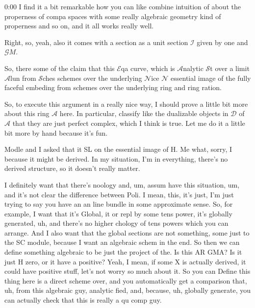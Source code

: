 \begin{unfinished}{0:00}
I find it a bit remarkable how you can like combine intuition of about the properness of compa spaces with some really algebraic geometry kind of properness and so on, and it all works really well.

Right, so, yeah, also it comes with a section as a unit section $\mathcal{I}$ given by one and $\mathcal{G}M$.

So, there some of the claim that this $\mathcal{E}$qa curve, which is $\mathcal{A}$nalytic $\mathcal{S}$t over a limit $\mathcal{A}$lun from $\mathcal{S}$ches schemes over the underlying $\mathcal{N}$ice $\mathcal{N}$ essential image of the fully faceful embeding from schemes over the underlying ring and ring ration.

So, to execute this argument in a really nice way, I should prove a little bit more about this ring $\mathcal{A}$ here. In particular, classify like the dualizable objects in $\mathcal{D}$ of $\mathcal{A}$ that they are just perfect complex, which I think is true. Let me do it a little bit more by hand because it's fun.

Modle and I asked that it SL on the essential image of H. Me what, sorry, I because it might be derived. In my situation, I'm in everything, there's no derived structure, so it doesn't really matter.

I definitely want that there's noology and, um, assum have this situation, um, and it's not clear the difference between Poli. I mean, this, it's just, I'm just trying to say you have an an line bundle in some approximate sense. So, for example, I want that it's Global, it or repl by some tens power, it's globally generated, uh, and there's no higher chology of tens powers which you can arrange. And I also want that the global sections are not something, some just to the SC module, because I want an algebraic schem in the end. So then we can define something algebraic to be just the project of the. Is this AR GMA? Is it just H zero, or it have a positive? Yeah, I mean, if some X is actually derived, it could have positive stuff, let's not worry so much about it. So you can Define this thing here is a direct scheme over, and you automatically get a comparison that, uh, from this algebraic guy, analytic fied, and, because, uh, globally generate, you can actually check that this is really a qu comp guy.


\end{unfinished}
